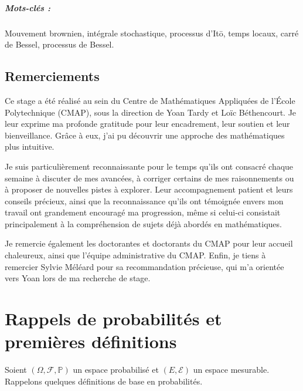 \documentclass[openany]{book}
\newcommand{\F}{\mathscr{F}}
\newcommand{\carE}{\mathscr{E}}
\renewcommand{\P}{\mathds{P}}
\newcommand{\1}{\mathbbm{1}}
\theoremstyle{thmfont}
\theoremstyle{deffont}
\theoremstyle{thmfont}
\theoremstyle{deffont}
\begin{document}
{\paragraph{Mots-clés :} Mouvement brownien, intégrale stochastique, processus d’Itō, temps locaux, carré de Bessel, processus de Bessel.

\section*{Remerciements}

Ce stage a été réalisé au sein du Centre de Mathématiques Appliquées de l’École Polytechnique (CMAP), sous la direction de Yoan Tardy et Loïc Béthencourt. Je leur exprime ma profonde gratitude pour leur encadrement, leur soutien et leur bienveillance. Grâce à eux, j’ai pu découvrir une approche des mathématiques plus intuitive.

Je suis particulièrement reconnaissante pour le temps qu’ils ont consacré chaque semaine à discuter de mes avancées, à corriger certains de mes raisonnements ou à proposer de nouvelles pistes à explorer. Leur accompagnement patient et leurs conseils précieux, ainsi que la reconnaissance qu’ils ont témoignée envers mon travail ont grandement encouragé ma progression, même si celui-ci consistait principalement à la compréhension de sujets déjà abordés en mathématiques.

Je remercie également les doctorantes et doctorants du CMAP pour leur accueil chaleureux, ainsi que l’équipe administrative du CMAP. Enfin, je tiens à remercier Sylvie Méléard pour sa recommandation précieuse, qui m’a orientée vers Yoan lors de ma recherche de stage.

}
\chapter{Rappels de probabilités et premières définitions}

Soient $(\Omega, \F, \P )$ un espace probabilisé et $(E, \carE)$ un espace mesurable. Rappelons quelques définitions de base en probabilités.
\end{document}
